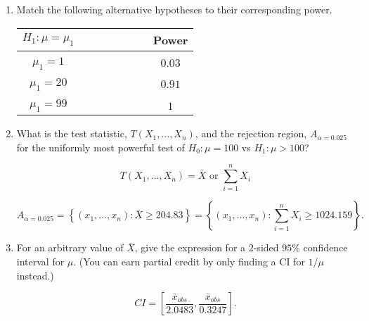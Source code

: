 \documentclass[12pt]{article}
\begin{document}
\begin{enumerate}[leftmargin=\labelsep]
\item Match the following alternative hypotheses to their corresponding power. 



\begin{table}[h]
\centering 
\begin{tabular}{cccccccc}
$H_1: \mu = \mu_1$ & & & & & & & \textbf{Power} \\
\hline \\
$\mu_1 = 1$   &        &         &          &    & & & $0.03$      \\
              &        &         &          &    & & &      \\
$\mu_1 = 20$  &        &         &          &    & & &  $0.91$   \\
              &        &         &          &    & & &      \\
$\mu_1 = 99$ &        &         &          &    & & &  $1$ 
\end{tabular}
\end{table}
 

\item What is the test statistic, $T(X_1, \dots, X_n)$, and the rejection region, $A_{\alpha = 0.025}$ for the uniformly most powerful test of $H_0: \mu = 100$ vs $H_1: \mu > 100$? 


$$T(X_1, \dots, X_n) = \bar{X} \text{ or } \sum_{i=1}^{n}X_i$$


$$A_{\alpha = 0.025}=  \left\{(x_1, \dots, x_n) : \bar{X} \geq 204.83 \right\} =  \left\{(x_1, \dots, x_n) : \sum_{i=1}^{n} X_i \geq 1024.159\right\}.$$


\item For an arbitrary value of $\bar{X}$, give the expression for a 2-sided $95\%$ confidence interval for $\mu$. (You can earn partial credit by only finding a CI for $1/\mu$ instead.) 

$$CI = \left[\frac{\bar{x}_{obs}}{2.0483} ,\frac{\bar{x}_{obs}}{0.3247} \right].$$


\end{enumerate}
\end{document}

